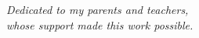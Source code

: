 \chapter*{}
\thispagestyle{empty}
\vspace*{5cm}
\begin{center}
{\Large\itshape Dedicated to my parents and teachers,\\[0.4cm]
whose support made this work possible.}
\end{center}
\cleardoublepage

